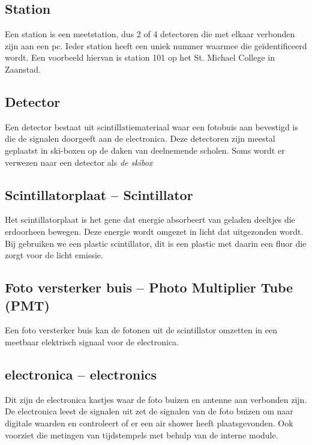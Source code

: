 \subsection{Station}

Een station is een meetstation, dus 2 of 4 detectoren die met elkaar
verbonden zijn aan een pc. Ieder station heeft een uniek nummer waarmee
die geïdentificeerd wordt. Een voorbeeld hiervan is station 101 op het
St. Michael College in Zaanstad.


\subsection{Detector}

Een detector bestaat uit scintillatiemateriaal waar een fotobuis aan
bevestigd is die de signalen doorgeeft aan de \hisparc electronica. Deze
detectoren zijn meestal geplaatst in ski-boxen op de daken van
deelnemende scholen. Soms wordt er verwezen naar een detector als
\emph{de skibox}


\subsection{Scintillatorplaat -- Scintillator}

Het scintillatorplaat is het gene dat energie absorbeert van geladen
deeltjes die erdoorheen bewegen. Deze energie wordt omgezet in licht dat
uitgezonden wordt. Bij \hisparc gebruiken we een plastic scintillator,
dit is een plastic met daarin een fluor die zorgt voor de licht emissie.


\subsection{Foto versterker buis -- Photo Multiplier Tube (PMT)}

Een foto versterker buis kan de fotonen uit de scintillator omzetten in
een meetbaar elektrisch signaal voor de \hisparc electronica.


\subsection{\hisparc electronica -- \hisparc electronics}

Dit zijn de electronica kastjes waar de foto buizen en \gps antenne aan
verbonden zijn. De electronica leest de signalen uit zet de signalen van
de foto buizen om naar digitale waarden en controleert of er een air
shower heeft plaatsgevonden. Ook voorziet die metingen van tijdstempels
met behulp van de interne \gps module.


